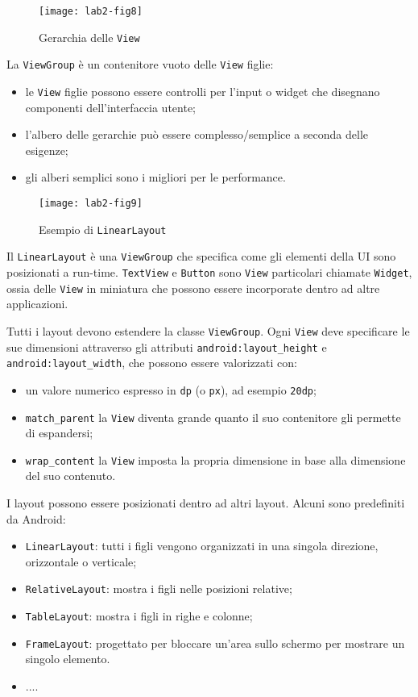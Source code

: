 \begin{figure}[htbp]
        \centering
        \texttt{[image: lab2-fig8]}
        \caption[Gerarchia View]{Gerarchia delle
\texttt{View}}\label{img:lab2-fig8}
\end{figure}

La \texttt{ViewGroup} è un contenitore vuoto delle \texttt{View} figlie:
\begin{itemize}
\item le \texttt{View} figlie possono essere controlli per l'input o widget che
disegnano componenti dell'interfaccia utente;
\item l'albero delle gerarchie può essere complesso/semplice a seconda delle
esigenze;
\item gli alberi semplici sono i migliori per le performance.
\end{itemize}

\begin{figure*}[htbp]
        \centering
        \texttt{[image: lab2-fig9]}
        \caption[LinearLayout]{Esempio di \texttt{LinearLayout}}
        \label{img:lab2-fig9}
\end{figure*}

Il \texttt{LinearLayout} è una \texttt{ViewGroup} che specifica come gli
elementi della UI sono posizionati a run-time. \texttt{TextView} e
\texttt{Button} sono \texttt{View} particolari chiamate \texttt{Widget}, ossia
delle \texttt{View} in miniatura che possono essere incorporate dentro ad altre
applicazioni.

Tutti i layout devono estendere la classe \texttt{ViewGroup}. Ogni \texttt{View}
deve specificare le sue dimensioni attraverso gli attributi 
\texttt{android:layout\_height} e \texttt{android:layout\_width}, che possono
essere valorizzati con:
\begin{itemize}
\item un valore numerico espresso in \texttt{dp} (o \texttt{px}), ad esempio 
\texttt{20dp};
\item \texttt{match\_parent} la \texttt{View} diventa grande
quanto il suo contenitore gli permette di espandersi;
\item \texttt{wrap\_content} la \texttt{View} imposta la
propria dimensione in base alla dimensione del suo contenuto.
\end{itemize}

I layout possono essere posizionati dentro ad altri layout. Alcuni sono
predefiniti da Android:

\begin{itemize}
\item \texttt{LinearLayout}: tutti i figli vengono organizzati in una singola
direzione, orizzontale o verticale;
\item \texttt{RelativeLayout}: mostra i figli nelle posizioni relative;
\item \texttt{TableLayout}: mostra i figli in righe e colonne;
\item \texttt{FrameLayout}: progettato per bloccare un'area sullo schermo per
mostrare un singolo elemento.
\item ....
\end{itemize}

